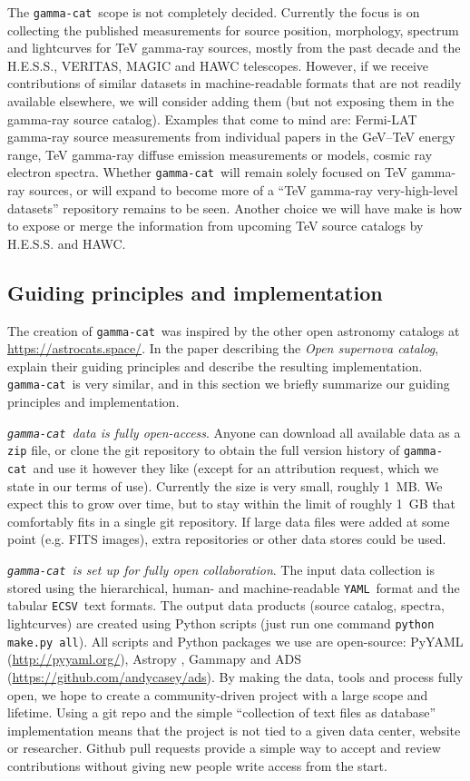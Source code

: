 \documentclass[11pt,twoside]{article}
\newcommand{\gammacat}{\texttt{gamma-cat}}
\newcommand{\yaml}{\texttt{YAML}}
\newcommand{\ecsv}{\texttt{ECSV}}
\newcommand{\astrocats}{\url{https://astrocats.space/}}
\newcommand{\pyads}{\url{https://github.com/andycasey/ads}}
\begin{document}
The \gammacat\ scope is not completely decided. Currently the focus is on
collecting the published measurements for source position, morphology, spectrum
and lightcurves for TeV gamma-ray sources, mostly from the past decade and the
H.E.S.S., VERITAS, MAGIC and HAWC telescopes. However, if we receive
contributions of similar datasets in machine-readable formats that are not
readily available elsewhere, we will consider adding them (but not exposing them
in the gamma-ray source catalog). Examples that come to mind are: Fermi-LAT
gamma-ray source measurements from individual papers in the GeV--TeV energy
range, TeV gamma-ray diffuse emission measurements or models, cosmic ray
electron spectra. Whether \gammacat\ will remain solely focused on TeV gamma-ray
sources, or will expand to become more of a ``TeV gamma-ray very-high-level
datasets'' repository remains to be seen. Another choice we will have make is
how to expose or merge the information from upcoming TeV source catalogs by
H.E.S.S. and HAWC.

\subsection{Guiding principles and implementation}

The creation of \gammacat\ was inspired by the other open astronomy catalogs at
\astrocats. In the paper describing the \emph{Open supernova catalog},
\citet{sne-cat} explain their guiding principles and describe the resulting
implementation. \gammacat\ is very similar, and in this section we briefly
summarize our guiding principles and implementation.

\emph{\gammacat\ data is fully open-access}. Anyone can download all available
data as a \texttt{zip} file, or clone the git repository to obtain the full
version history of \gammacat\ and use it however they like (except for an
attribution request, which we state in our terms of use). Currently the size is
very small, roughly 1~MB. We expect this to grow over time, but to stay within
the limit of roughly 1~GB that comfortably fits in a single git repository. If
large data files were added at some point (e.g. FITS images), extra repositories
or other data stores could be used.

\emph{\gammacat\ is set up for fully open collaboration}. The input data
collection is stored using the hierarchical, human- and machine-readable \yaml\
format and the tabular \ecsv\ text formats. The output data products (source
catalog, spectra, lightcurves) are created using Python scripts (just run one
command \texttt{python make.py all}). All scripts and Python packages we use are
open-source: PyYAML (\url{http://pyyaml.org/}), Astropy \citep{astropy}, Gammapy
\citep{gammapy} and ADS (\pyads). By making the data, tools and process fully
open, we hope to create a community-driven project with a large scope and
lifetime. Using a git repo and the simple ``collection of text files as
database'' implementation means that the project is not tied to a given data
center, website or researcher. Github pull requests provide a simple way to
accept and review contributions without giving new people write access from the
start.
\end{document}
